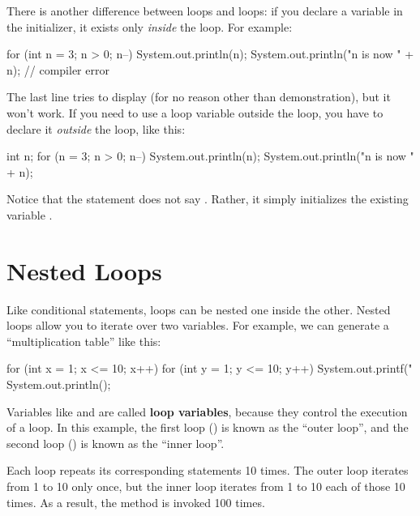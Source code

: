 There is another difference between  loops and  loops: if you declare a variable in the initializer, it exists only {\em inside} the  loop.
For example:

\begin{code}
for (int n = 3; n > 0; n--) {
    System.out.println(n);
}
System.out.println("n is now " + n);  // compiler error
\end{code}

The last line tries to display  (for no reason other than demonstration), but it won't work.
If you need to use a loop variable outside the loop, you have to declare it {\em outside} the loop, like this:

\begin{code}
int n;
for (n = 3; n > 0; n--) {
    System.out.println(n);
}
System.out.println("n is now " + n);
\end{code}

Notice that the  statement does not say .
Rather, it simply initializes the existing variable .


\section{Nested Loops}
\label{nested}


Like conditional statements, loops can be nested one inside the other.
Nested loops allow you to iterate over two variables.
For example, we can generate a ``multiplication table'' like this:

\begin{code}
for (int x = 1; x <= 10; x++) {
    for (int y = 1; y <= 10; y++) {
        System.out.printf("%
    }
    System.out.println();
}
\end{code}


Variables like  and  are called {\bf loop variables}, because they control the execution of a loop.
In this example, the first loop () is known as the ``outer loop'', and the second loop () is known as the ``inner loop''.

Each loop repeats its corresponding statements 10 times.
The outer loop iterates from 1 to 10 only once, but the inner loop iterates from 1 to 10 each of those 10 times.
As a result, the  method is invoked 100 times.

